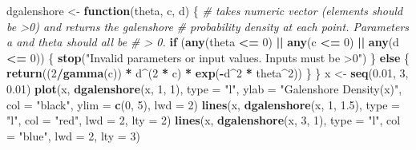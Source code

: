 \documentclass[
]{article}
\newenvironment{Shaded}{\begin{snugshade}}{\end{snugshade}}
\newcommand{\CommentTok}[1]{\textcolor[rgb]{0.56,0.35,0.01}{\textit{#1}}}
\newcommand{\ControlFlowTok}[1]{\textcolor[rgb]{0.13,0.29,0.53}{\textbf{#1}}}
\newcommand{\DataTypeTok}[1]{\textcolor[rgb]{0.13,0.29,0.53}{#1}}
\newcommand{\DecValTok}[1]{\textcolor[rgb]{0.00,0.00,0.81}{#1}}
\newcommand{\FloatTok}[1]{\textcolor[rgb]{0.00,0.00,0.81}{#1}}
\newcommand{\KeywordTok}[1]{\textcolor[rgb]{0.13,0.29,0.53}{\textbf{#1}}}
\newcommand{\NormalTok}[1]{#1}
\newcommand{\OperatorTok}[1]{\textcolor[rgb]{0.81,0.36,0.00}{\textbf{#1}}}
\newcommand{\StringTok}[1]{\textcolor[rgb]{0.31,0.60,0.02}{#1}}
\begin{document}
\begin{Shaded}
\begin{Highlighting}[]
\NormalTok{dgalenshore <-}\StringTok{ }\ControlFlowTok{function}\NormalTok{(theta, c, d) \{}
    \CommentTok{# takes numeric vector (elements should be >0) and returns the galenshore}
    \CommentTok{# probability density at each point. Parameters a and theta should all be}
    \CommentTok{# > 0.}
    \ControlFlowTok{if}\NormalTok{ (}\KeywordTok{any}\NormalTok{(theta }\OperatorTok{<=}\StringTok{ }\DecValTok{0}\NormalTok{) }\OperatorTok{||}\StringTok{ }\KeywordTok{any}\NormalTok{(c }\OperatorTok{<=}\StringTok{ }\DecValTok{0}\NormalTok{) }\OperatorTok{||}\StringTok{ }\KeywordTok{any}\NormalTok{(d }\OperatorTok{<=}\StringTok{ }\DecValTok{0}\NormalTok{)) \{}
        \KeywordTok{stop}\NormalTok{(}\StringTok{"Invalid parameters or input values. Inputs must be >0"}\NormalTok{)}
\NormalTok{    \} }\ControlFlowTok{else}\NormalTok{ \{}
        \KeywordTok{return}\NormalTok{((}\DecValTok{2}\OperatorTok{/}\KeywordTok{gamma}\NormalTok{(c)) }\OperatorTok{*}\StringTok{ }\NormalTok{d}\OperatorTok{^}\NormalTok{(}\DecValTok{2} \OperatorTok{*}\StringTok{ }\NormalTok{c) }\OperatorTok{*}\StringTok{ }\KeywordTok{exp}\NormalTok{(}\OperatorTok{-}\NormalTok{d}\OperatorTok{^}\DecValTok{2} \OperatorTok{*}\StringTok{ }\NormalTok{theta}\OperatorTok{^}\DecValTok{2}\NormalTok{))}
\NormalTok{    \}}
\NormalTok{\}}
\NormalTok{x <-}\StringTok{ }\KeywordTok{seq}\NormalTok{(}\FloatTok{0.01}\NormalTok{, }\DecValTok{3}\NormalTok{, }\FloatTok{0.01}\NormalTok{)}
\KeywordTok{plot}\NormalTok{(x, }\KeywordTok{dgalenshore}\NormalTok{(x, }\DecValTok{1}\NormalTok{, }\DecValTok{1}\NormalTok{), }\DataTypeTok{type =} \StringTok{"l"}\NormalTok{, }\DataTypeTok{ylab =} \StringTok{"Galenshore Density(x)"}\NormalTok{, }\DataTypeTok{col =} \StringTok{"black"}\NormalTok{, }
    \DataTypeTok{ylim =} \KeywordTok{c}\NormalTok{(}\DecValTok{0}\NormalTok{, }\DecValTok{5}\NormalTok{), }\DataTypeTok{lwd =} \DecValTok{2}\NormalTok{) }
\KeywordTok{lines}\NormalTok{(x, }\KeywordTok{dgalenshore}\NormalTok{(x, }\DecValTok{1}\NormalTok{, }\FloatTok{1.5}\NormalTok{), }\DataTypeTok{type =} \StringTok{"l"}\NormalTok{, }\DataTypeTok{col =} \StringTok{"red"}\NormalTok{, }\DataTypeTok{lwd =} \DecValTok{2}\NormalTok{, }\DataTypeTok{lty =} \DecValTok{2}\NormalTok{)}
\KeywordTok{lines}\NormalTok{(x, }\KeywordTok{dgalenshore}\NormalTok{(x, }\DecValTok{3}\NormalTok{, }\DecValTok{1}\NormalTok{), }\DataTypeTok{type =} \StringTok{"l"}\NormalTok{, }\DataTypeTok{col =} \StringTok{"blue"}\NormalTok{, }\DataTypeTok{lwd =} \DecValTok{2}\NormalTok{, }\DataTypeTok{lty =} \DecValTok{3}\NormalTok{)}

\end{Highlighting}
\end{Shaded}
\end{document}
